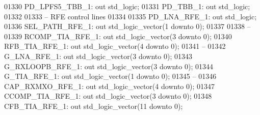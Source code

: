 \begin{DoxyCode}
01330         PD\_LPFS5\_TBB\_1:     \textcolor{keywordflow}{out} \textcolor{comment}{std\_logic};
01331         PD\_TBB\_1:           \textcolor{keywordflow}{out} \textcolor{comment}{std\_logic};
01332 
01333 \textcolor{keyword}{        -- RFE control lines}
01334         
01335         PD\_LNA\_RFE\_1:       \textcolor{keywordflow}{out} \textcolor{comment}{std\_logic};
01336         SEL\_PATH\_RFE\_1:     \textcolor{keywordflow}{out} \textcolor{comment}{std\_logic\_vector}(\textcolor{vhdllogic}{}\textcolor{vhdllogic}{1} \textcolor{keywordflow}{downto} \textcolor{vhdllogic}{}\textcolor{vhdllogic}{0});
01337         
01338 \textcolor{keyword}{        --}
01339         RCOMP\_TIA\_RFE\_1:    \textcolor{keywordflow}{out} \textcolor{comment}{std\_logic\_vector}(\textcolor{vhdllogic}{}\textcolor{vhdllogic}{3} \textcolor{keywordflow}{downto} \textcolor{vhdllogic}{}\textcolor{vhdllogic}{0});
01340         RFB\_TIA\_RFE\_1:  \textcolor{keywordflow}{out} \textcolor{comment}{std\_logic\_vector}(\textcolor{vhdllogic}{}\textcolor{vhdllogic}{4} \textcolor{keywordflow}{downto} \textcolor{vhdllogic}{}\textcolor{vhdllogic}{0});
01341 \textcolor{keyword}{        --}
01342         G\_LNA\_RFE\_1:    \textcolor{keywordflow}{out} \textcolor{comment}{std\_logic\_vector}(\textcolor{vhdllogic}{}\textcolor{vhdllogic}{3} \textcolor{keywordflow}{downto} \textcolor{vhdllogic}{}\textcolor{vhdllogic}{0});
01343         G\_RXLOOPB\_RFE\_1:    \textcolor{keywordflow}{out} \textcolor{comment}{std\_logic\_vector}(\textcolor{vhdllogic}{}\textcolor{vhdllogic}{3} \textcolor{keywordflow}{downto} \textcolor{vhdllogic}{}\textcolor{vhdllogic}{0});
01344         G\_TIA\_RFE\_1:    \textcolor{keywordflow}{out} \textcolor{comment}{std\_logic\_vector}(\textcolor{vhdllogic}{}\textcolor{vhdllogic}{1} \textcolor{keywordflow}{downto} \textcolor{vhdllogic}{}\textcolor{vhdllogic}{0});
01345 \textcolor{keyword}{        --}
01346         CAP\_RXMXO\_RFE\_1:    \textcolor{keywordflow}{out} \textcolor{comment}{std\_logic\_vector}(\textcolor{vhdllogic}{}\textcolor{vhdllogic}{4} \textcolor{keywordflow}{downto} \textcolor{vhdllogic}{}\textcolor{vhdllogic}{0});
01347         CCOMP\_TIA\_RFE\_1:    \textcolor{keywordflow}{out} \textcolor{comment}{std\_logic\_vector}(\textcolor{vhdllogic}{}\textcolor{vhdllogic}{3} \textcolor{keywordflow}{downto} \textcolor{vhdllogic}{}\textcolor{vhdllogic}{0});
01348         CFB\_TIA\_RFE\_1:  \textcolor{keywordflow}{out} \textcolor{comment}{std\_logic\_vector}(\textcolor{vhdllogic}{}\textcolor{vhdllogic}{11} \textcolor{keywordflow}{downto} \textcolor{vhdllogic}{}\textcolor{vhdllogic}{0});

\end{DoxyCode}
